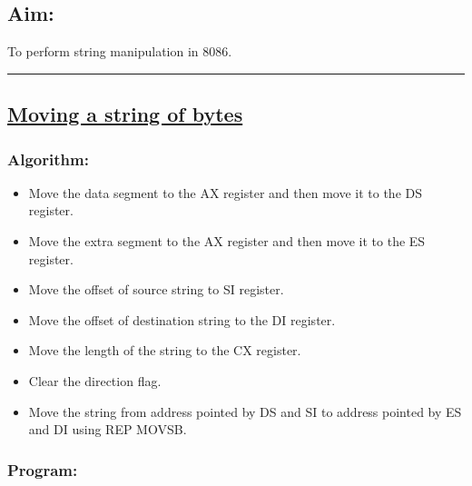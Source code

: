 \documentclass[12pt,a4paper]{article}
\begin{document}
\begin{flushleft}
\subsection*{\textbf{Aim:}} 
To perform string manipulation in 8086.

\vspace{1cm}
\hrule
\subsection*{\textbf{\underline{Moving a string of bytes}}}

\subsubsection*{\textbf{Algorithm:}}
\begin{itemize}
    \item Move the data segment to the AX register and then move it to the DS register.
    \item Move the extra segment to the AX register and then move it to the ES register.
    \item Move the offset of source string to SI register. 
    \item Move the offset of destination string to the DI register. 
    \item Move the length of the string to the CX register.
    \item Clear the direction flag. 
    \item Move the string from address pointed by DS and SI to address pointed by ES and DI using REP MOVSB.
\end{itemize}

\newpage
\subsubsection*{\textbf{Program:}}


\end{flushleft}
\end{document}
